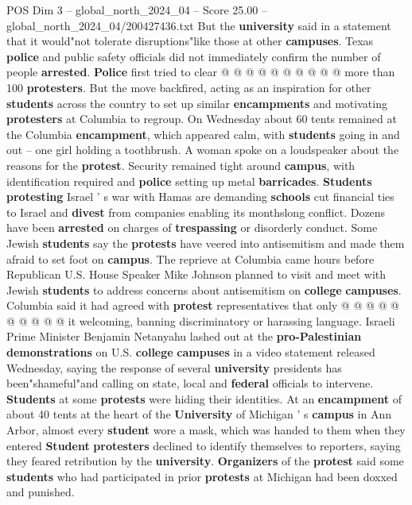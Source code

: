 \begin{textsample}{POS Dim 3 – global\_north\_2024\_04 – Score 25.00 – global\_north\_2024\_04/200427436.txt}
But the \textbf{university} said in a statement that it would"not tolerate disruptions"like those at other \textbf{campuses}.
Texas \textbf{police} and public safety officials did not immediately confirm the number of people \textbf{arrested}. \textbf{Police} first tried to clear @ @ @ @ @ @ @ @ @ @ more than 100 \textbf{protesters}.
But the move backfired, acting as an inspiration for other \textbf{students} across the country to set up similar \textbf{encampments} and motivating \textbf{protesters} at Columbia to regroup.
On Wednesday about 60 tents remained at the Columbia \textbf{encampment}, which appeared calm, with \textbf{students} going in and out -- one girl holding a toothbrush.
A woman spoke on a loudspeaker about the reasons for the \textbf{protest}.
Security remained tight around \textbf{campus}, with identification required and \textbf{police} setting up metal \textbf{barricades}. \textbf{Students} \textbf{protesting} Israel ' s war with Hamas are demanding \textbf{schools} cut financial ties to Israel and \textbf{divest} from companies enabling its monthslong conflict.
Dozens have been \textbf{arrested} on charges of \textbf{trespassing} or disorderly conduct.
Some Jewish \textbf{students} say the \textbf{protests} have veered into antisemitism and made them afraid to set foot on \textbf{campus}.
The reprieve at Columbia came hours before Republican U.S.
House Speaker Mike Johnson planned to visit and meet with Jewish \textbf{students} to address concerns about antisemitism on \textbf{college} \textbf{campuses}.
Columbia said it had agreed with \textbf{protest} representatives that only @ @ @ @ @ @ @ @ @ @ it welcoming, banning discriminatory or harassing language.
Israeli Prime Minister Benjamin Netanyahu lashed out at the \textbf{pro-Palestinian} \textbf{demonstrations} on U.S. \textbf{college} \textbf{campuses} in a video statement released Wednesday, saying the response of several \textbf{university} presidents has been"shameful"and calling on state, local and \textbf{federal} officials to intervene. \textbf{Students} at some \textbf{protests} were hiding their identities.
At an \textbf{encampment} of about 40 tents at the heart of the \textbf{University} of Michigan ' s \textbf{campus} in Ann Arbor, almost every \textbf{student} wore a mask, which was handed to them when they entered \textbf{Student} \textbf{protesters} declined to identify themselves to reporters, saying they feared retribution by the \textbf{university}. \textbf{Organizers} of the \textbf{protest} said some \textbf{students} who had participated in prior \textbf{protests} at Michigan had been doxxed and punished.

\end{textsample}
